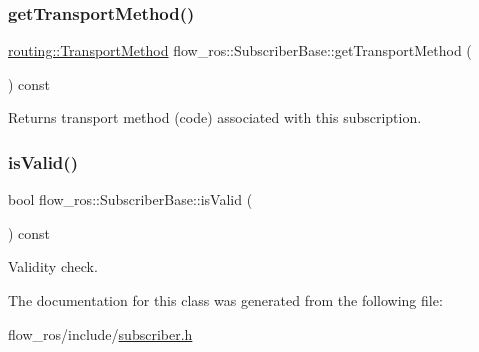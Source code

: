 \subsubsection{\texorpdfstring{get\+Transport\+Method()}{getTransportMethod()}}
{\footnotesize\ttfamily \hyperlink{transport__info_8h_ae57afcf849a5bdb82b958347c6ccc57b}{routing\+::\+Transport\+Method} flow\+\_\+ros\+::\+Subscriber\+Base\+::get\+Transport\+Method (\begin{DoxyParamCaption}{ }\end{DoxyParamCaption}) const\hspace{0.3cm}{\ttfamily [inline]}}



Returns transport method (code) associated with this subscription. 

\mbox{\label{classflow__ros_1_1_subscriber_base_a1c2ed330f95a5711c6f71b80b556e742}} 
\subsubsection{\texorpdfstring{is\+Valid()}{isValid()}}
{\footnotesize\ttfamily bool flow\+\_\+ros\+::\+Subscriber\+Base\+::is\+Valid (\begin{DoxyParamCaption}{ }\end{DoxyParamCaption}) const\hspace{0.3cm}{\ttfamily [inline]}}



Validity check. 



The documentation for this class was generated from the following file\+:\begin{DoxyCompactItemize}
\item 
flow\+\_\+ros/include/\hyperlink{subscriber_8h}{subscriber.\+h}\end{DoxyCompactItemize}
